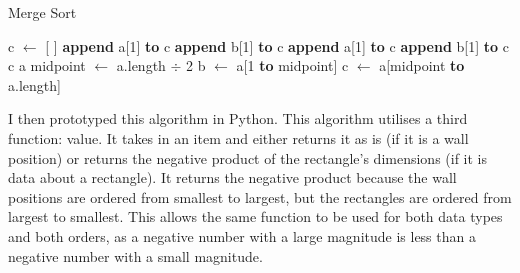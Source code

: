 \documentclass[titlepage]{article}
\begin{document}
\begin{algorithm}[H]
\caption{Merge Sort}
\begin{algorithmic}[1]
		\State c  $\gets$ [ ]
				\State \textbf{append} a[1] \textbf{to} c
			\Else
				\State \textbf{append} b[1] \textbf{to} c
			\EndIf
		\EndWhile
			\State \textbf{append} a[1] \textbf{to} c
		\EndWhile
			\State \textbf{append} b[1] \textbf{to} c
		\EndWhile
		\State \Return c
	\EndProcedure
	\State 
			\State \Return a
		\EndIf
		\State midpoint $\gets$ a.length $\div$ 2
		\State b $\gets$ a[1 \textbf{to} midpoint]
		\State c $\gets$ a[midpoint \textbf{to} a.length]
		\State \Return {}
	\EndProcedure
\end{algorithmic}
\end{algorithm}

I then prototyped this algorithm in Python. This algorithm utilises a third function: value. It takes in an item and either returns it as is (if it is a wall position) or returns the negative product of the rectangle's dimensions (if it is data about a rectangle). It returns the negative product because the wall positions are ordered from smallest to largest, but the rectangles are ordered from largest to smallest. This allows the same function to be used for both data types and both orders, as a negative number with a large magnitude is less than a negative number with a small magnitude. 
\end{document}
